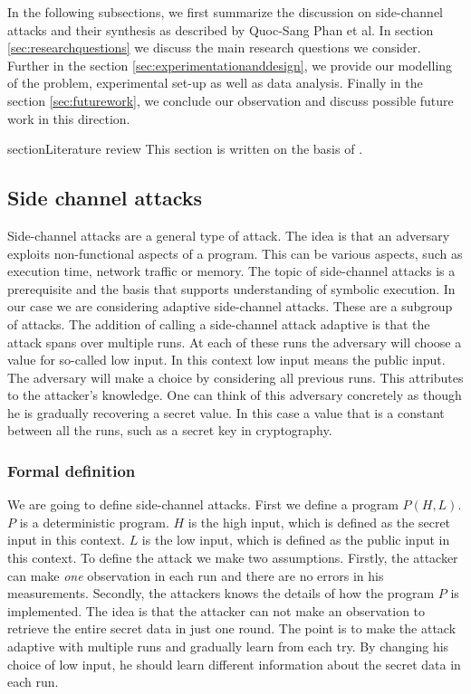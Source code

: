 \documentclass[11pt,a4paper,notitlepage]{article}
\begin{document}
In the following subsections, we first summarize the discussion on side-channel attacks and their synthesis as described by Quoc-Sang Phan et al. In section \ref{sec:researchquestions} we discuss the main research questions we consider.
Further in the section \ref{sec:experimentationanddesign}, we provide our modelling of the problem, experimental set-up as well as data analysis.
Finally in the section \ref{sec:futurework}, we conclude our observation and discuss possible future work in this direction.

section{Literature review}
\label{cha:literaturereview}
This section is written on the basis of \cite{phan2017synthesis}.

\subsection{Side channel attacks}
\label{sec:sidechannelattacks}

Side-channel attacks are a general type of attack. The idea is that an adversary exploits non-functional aspects of a program. This can be various aspects, such as execution time, network traffic or memory. The topic of side-channel attacks is a prerequisite and the basis that supports understanding of symbolic execution. In our case we are considering adaptive side-channel attacks. These are a subgroup of attacks. The addition of calling a side-channel attack adaptive is that the attack spans over multiple runs. At each of these runs the adversary will choose a value for so-called low input. In this context low input means the public input. The adversary will make a choice by considering all previous runs. This attributes to the attacker's knowledge. One can think of this adversary concretely as though he is gradually recovering a secret value. In this case a value that is a constant between all the runs, such as a secret key in cryptography. 

\subsubsection{Formal definition}

We are going to define side-channel attacks. First we define a program $P(H,L)$. $P$ is a deterministic program. $H$ is the high input, which is defined as the secret input in this context. $L$ is the low input, which is defined as the public input in this context. To define the attack we make two assumptions. Firstly, the attacker can make \textit{one} observation in each run and there are no errors in his measurements. Secondly, the attackers knows the details of how the program $P$ is implemented. The idea is that the attacker can not make an observation to retrieve the entire secret data in just one round. The point is to make the attack adaptive with multiple runs and gradually learn from each try. By changing his choice of low input, he should learn different information about the secret data in each run. 
\end{document}
